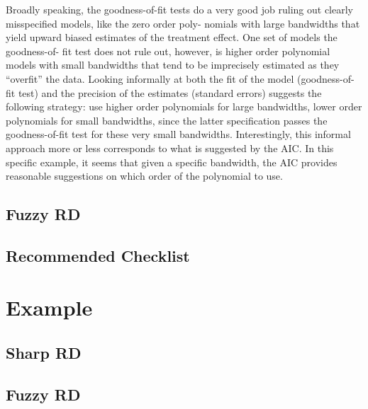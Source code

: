 \documentclass[11pt]{book}%
\begin{document}
 Broadly speaking, the goodness-of-fit tests do a very good job ruling out clearly misspecified models, like the zero order poly- nomials with large bandwidths that yield upward biased estimates of the treatment effect.  One set of models the goodness-of- fit test does not rule out, however, is higher order polynomial models with small bandwidths that tend to be imprecisely estimated as they “overfit” the data. Looking informally at both the fit of the model (goodness-of-fit test) and the precision of the estimates (standard errors) suggests the following strategy: use higher order polynomials for large bandwidths, lower order polynomials for small bandwidths, since the latter specification passes the goodness-of-fit test for these very small bandwidths. Interestingly, this informal approach more or less corresponds to what is suggested by the AIC. In this specific example, it seems that given a specific bandwidth, the AIC provides reasonable suggestions on which order of the polynomial to use.
 
 
\subsection{Fuzzy RD}


\subsection{Recommended Checklist}


\section{Example}
\subsection{Sharp RD}

\subsection{Fuzzy RD}






\newpage 
%

\end{document}
